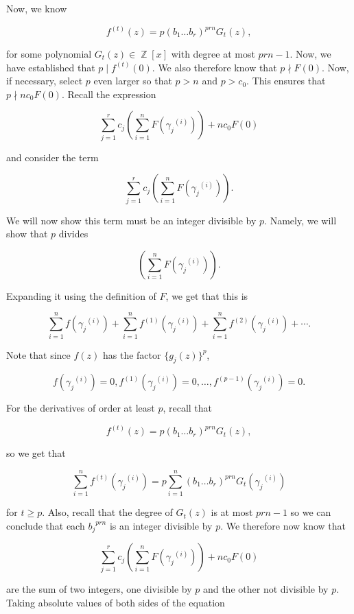 \documentclass[a4paper, 11pt]{book}
\DeclareMathOperator{\Z}{\mathbb{Z}}
\begin{document}
{    Now, we know 

    \[f^{(t)}(z) = p{(b_1\ldots b_r)}^{prn} G_t(z),\]

    for some polynomial $G_t(z) \in \Z[x]$ with degree at most $prn-1$. Now, we have established that $p \mid f^{(t)}(0)$. We also therefore know that $p \nmid F(0)$. Now, if necessary, select $p$ even larger so that $p > n$ and $p > c_0$. This ensures that $p \nmid nc_0F(0)$. Recall the expression 

    \[\sum\limits_{j=1}^{r}c_j\left(\sum\limits_{i=1}^{n} F({\gamma_j}^{(i)})\right) + nc_0F(0) \]

    and consider the term

    \[\sum\limits_{j=1}^{r}c_j\left(\sum\limits_{i=1}^{n} F({\gamma_j}^{(i)})\right).\] 

    We will now show this term must be an integer divisible by $p$. Namely, we will show that $p$ divides

    \[\left(\sum\limits_{i=1}^{n} F({\gamma_j}^{(i)})\right).\]

    Expanding it using the definition of $F$, we get that this is

    \[\sum\limits_{i=1}^{n}f({\gamma_j}^{(i)}) + \sum\limits_{i=1}^{n}f^{(1)}({\gamma_j}^{(i)}) + \sum\limits_{i=1}^{n}f^{(2)}({\gamma_j}^{(i)}) + \cdots.\]

    Note that since $f(z)$ has the factor ${\{g_j(z)\}}^{p}$, 

    \[f({\gamma_j}^{(i)}) = 0, f^{(1)}({\gamma_j}^{(i)}) = 0, \ldots, f^{(p-1)}({\gamma_j}^{(i)}) = 0.\]

    For the derivatives of order at least $p$, recall that 

    \[f^{(t)}(z) = p{(b_1\ldots b_r)}^{prn} G_t(z),\]

    so we get that 

    \[\sum\limits_{i=1}^{n}{f^{(t)}}({\gamma_j}^{(i)}) = p \sum\limits_{i=1}^{n} {(b_1\ldots b_r)}^{prn} G_t({\gamma_{j}}^{(i)})\]

    for $t \geq p$. Also, recall that the degree of $G_t(z)$ is at most $prn-1$ so we can conclude that each ${b_j}^{prn}$ is an integer divisible by $p$. We therefore now know that  

    \[\sum\limits_{j=1}^{r}c_j\left(\sum\limits_{i=1}^{n} F({\gamma_j}^{(i)})\right) + nc_0F(0) \]

    are the sum of two integers, one divisible by $p$ and the other not divisible by $p$. Taking absolute values of both sides of the equation

}
\end{document}
